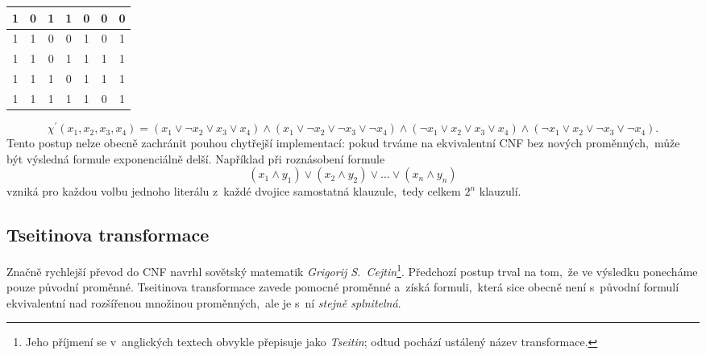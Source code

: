 \begin{example}
\begin{table}[ht]
\begin{tabular}{|c|c|c|c|c|c|c|}
        1     & 0     & 1     & 1     & 0             & 0                                                 & 0                                    \\ \hline
        1     & 1     & 0     & 0     & 1             & 0                                                 & 1                                    \\ \hline
        1     & 1     & 0     & 1     & 1             & 1                                                 & 1                                    \\ \hline
        1     & 1     & 1     & 0     & 1             & 1                                                 & 1                                    \\ \hline
        1     & 1     & 1     & 1     & 1             & 0                                                 & 1                                    \\ \hline
        \end{tabular}
    \end{table}
    \[\chi^\prime(x_1,x_2,x_3,x_4)=(x_1\lor\neg x_2\lor x_3\lor x_4)\land(x_1\lor\neg x_2\lor\neg x_3\lor\neg x_4)\land(\neg x_1\lor x_2\lor x_3\lor x_4)\land(\neg x_1\lor x_2\lor\neg x_3\lor\neg x_4).\]
    Tento postup nelze obecně zachránit pouhou chytřejší implementací: pokud trváme na ekvivalentní CNF bez nových proměnných,~může být výsledná formule exponenciálně delší. Například při roznásobení formule
    \[(x_1\land y_1)\lor(x_2\land y_2)\lor\dots\lor(x_n\land y_n)\]
    vzniká pro každou volbu jednoho literálu z~každé dvojice samostatná klauzule,~tedy celkem $2^n$ klauzulí.
\end{example}

\subsection{Tseitinova transformace}\label{subsec:cnf_tseitin}

Značně rychlejší převod do CNF navrhl sovětský matematik \emph{Grigorij S.~Cejtin}\footnote{Jeho příjmení se v~anglických textech obvykle přepisuje jako \emph{Tseitin}; odtud pochází ustálený název transformace.}. Předchozí postup trval na tom,~že ve výsledku ponecháme pouze původní proměnné. Tseitinova transformace zavede pomocné proměnné a~získá formuli,~která sice obecně není s~původní formulí ekvivalentní nad rozšířenou množinou proměnných,~ale je s~ní \emph{stejně splnitelná}.

